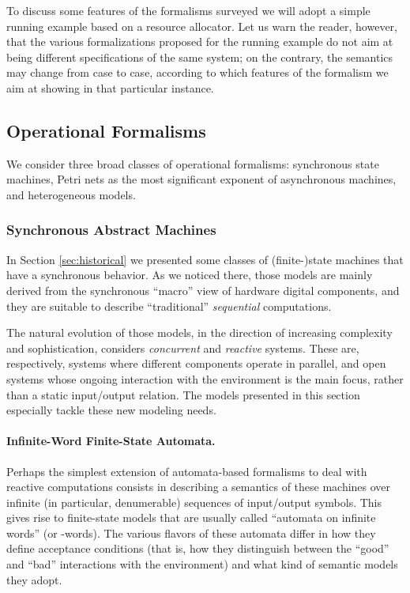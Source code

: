 To discuss some features of the formalisms surveyed we will 
adopt a simple running example based on a resource allocator. 
Let us warn the reader, however, that the various formalizations 
proposed for the running example do not aim at being different 
specifications of the same system; on the contrary, the semantics 
may change from case to case, according to which features of 
the formalism we aim at showing in that particular instance.



\subsection{Operational Formalisms} \label{sec:operational}
We consider three broad classes of operational formalisms: synchronous 
state machines, Petri nets as the most significant exponent of 
asynchronous machines, and heterogeneous models.


\subsubsection{Synchronous Abstract Machines} \label{sec:synchronous}
In Section \ref{sec:historical} we presented some classes of (finite-)state 
machines that have a synchronous behavior. As we noticed there, 
those models are mainly derived from the synchronous ``macro'' 
view of hardware digital components, and they are suitable to 
describe ``traditional'' \emph{sequential} computations.

The natural evolution of those models, in the direction of increasing
complexity and sophistication, considers \emph{concurrent} and
\emph{reactive} systems. These are, respectively, systems where
different components operate in parallel, and open systems whose
ongoing interaction with the environment is the main focus, rather
than a static input/output relation. The models presented in this
section especially tackle these new modeling needs.


\paragraph{Infinite-Word Finite-State Automata.}
Perhaps the simplest extension of automata-based formalisms to 
deal with reactive computations consists in describing a semantics 
of these machines over infinite (in particular, denumerable) 
sequences of input/output symbols. This gives rise to finite-state 
models that are usually called ``automata on infinite words'' (or -words).
The various flavors of these automata differ in how they define 
acceptance conditions (that is, how they distinguish between 
the ``good'' and ``bad'' interactions with the environment) and 
what kind of semantic models they adopt.

